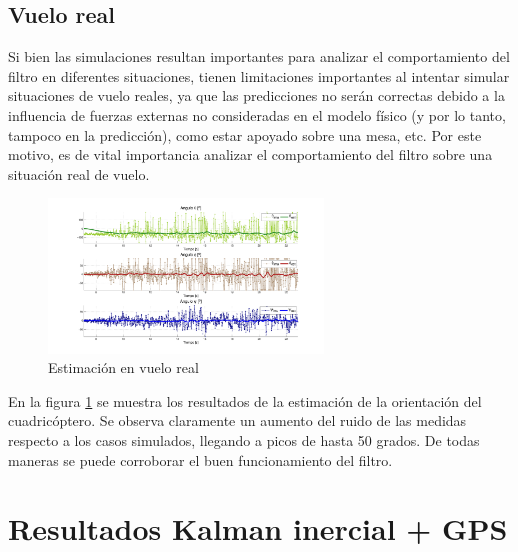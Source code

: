 \documentclass[main]{subfiles}
\begin{document}
\subsection{Vuelo real}

Si bien las simulaciones resultan importantes para analizar el comportamiento del filtro en diferentes situaciones, tienen limitaciones importantes al intentar simular situaciones de vuelo reales, ya que las predicciones no serán correctas debido a la influencia de fuerzas externas no consideradas en el modelo físico (y por lo tanto, tampoco en la predicción), como estar apoyado sobre una mesa, etc. Por este motivo, es de vital importancia analizar el comportamiento del filtro sobre una situación real de vuelo.\\

\begin{figure}
	\vspace{-40pt}
	\begin{center}
          \hspace{-50pt}
	\vspace{-30pt}
	\includegraphics[width=0.65\textwidth]
		{./pics_kalman/andando.pdf}
	\end{center}
	\caption{Estimación en vuelo real}
	\label{fig:andando}
\end{figure}

En la figura \ref{fig:andando} se muestra los resultados de la estimación de la orientación del cuadricóptero. Se observa claramente un aumento del ruido de las medidas respecto a los casos simulados, llegando a picos de hasta 50 grados. De todas maneras se puede corroborar el buen funcionamiento del filtro.\\

\section{Resultados Kalman inercial + GPS}
\end{document}
